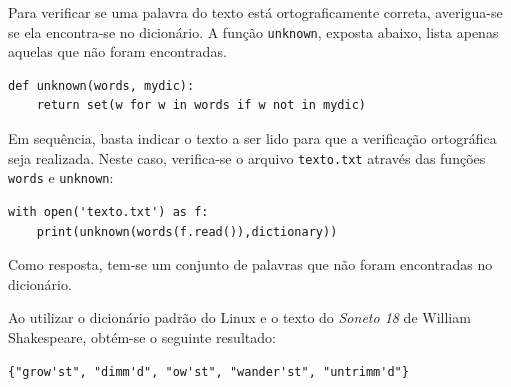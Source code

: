 \documentclass{textolivre}
\begin{document}
Para verificar se uma palavra do texto está ortograficamente
correta, averigua-se se ela encontra-se no dicionário.
A função \texttt{unknown}, exposta
abaixo, lista apenas aquelas que
não foram encontradas.
\begin{lstlisting}[label=lst-wordstxt-spellpy]
def unknown(words, mydic): 
    return set(w for w in words if w not in mydic)
\end{lstlisting}%
Em sequência, basta indicar o texto
a ser lido para que a verificação
ortográfica seja realizada. Neste caso,
verifica-se o arquivo
\texttt{texto.txt} através das funções
\texttt{words} e \texttt{unknown}:
\begin{lstlisting}[label=lst-wordstxt-spellpy]
with open('texto.txt') as f:
    print(unknown(words(f.read()),dictionary))
\end{lstlisting}%
Como resposta, tem-se um conjunto de palavras que não foram encontradas no dicionário.
 



Ao utilizar o dicionário padrão do Linux e o texto do \textit{Soneto 18} de William Shakespeare,
obtém-se o seguinte resultado:
\begin{lstlisting}[label=lst-result-spellpy]
{"grow'st", "dimm'd", "ow'st", "wander'st", "untrimm'd"}
\end{lstlisting}%
\end{document}
